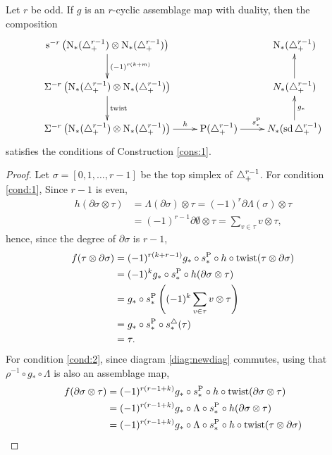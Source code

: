 \begin{proposition}\label{prop:assemblage}
	Let $r$ be odd. If $g$ is an $r$-cyclic assemblage map with duality, then the composition 
	\[\xymatrix{
	\sus{-r}\left(\chains(\asimplex^{r-1})\otimes \chains(\asimplex^{r-1})\right)\ar[d]^{(-1)^{r(k+m)}}&&
		 \chains(\asimplex^{r-1})
		\\
	\susp{-r}\left(\chains(\asimplex^{r-1})\otimes \chains(\asimplex^{r-1})\right)\ar[d]^-{\twist} &&
		 \cadenas(\asimplex^{r-1})\ar[u]
	\\
	\susp{-r}\left(\chains(\asimplex^{r-1})\otimes \chains(\asimplex^{r-1})\right)\ar[r]^-{h} &
	\Psd(\asimplex^{r-1}) \ar[r]^{s_*^{\Psd}} &
	\cadenas(\sd\asimplex^{r-1})\ar[u]_{g_*}
		}
	\]
satisfies the conditions of Construction \ref{cons:1}.
\end{proposition}
\begin{proof}
	Let $\sigma = [0,1,\ldots,r-1]$ be the top simplex of $\triangle_{+}^{r-1}$. For condition \eqref{cond:1},  Since $r-1$ is even,
		\begin{align*}
		h(\partial\sigma\otimes \tau) &= \Lambda(\partial \sigma)\otimes \tau = (-1)^{r}\partial \Lambda(\sigma)\otimes\tau 
		\\&= (-1)^{r-1}\partial\emptyset\otimes\tau = \sum_{v\in \tau} v\otimes\tau,
	\end{align*}
	hence, since the degree of $\partial \sigma$ is $r-1$,
	\begin{align*}
		f(\tau\otimes \partial\sigma)
		&=(-1)^{r(k+r-1)} g_*\circ s_*^{\operatorname{P}}\circ h \circ \mathrm{twist}(\tau\otimes \partial\sigma)\\
		&= (-1)^{k} g_*\circ s_*^{\operatorname{P}}\circ h (\partial\sigma\otimes \tau)\\
		&= g_*\circ s_*^{\operatorname{P}}\left((-1)^k\sum_{v\in \tau} v\otimes\tau\right) \\
		&= g_*\circ s_*^{\operatorname{P}}\circ s_*^{\triangle}(\tau) \\
		&= \tau.
	\end{align*}
	For condition \eqref{cond:2}, since diagram \eqref{diag:newdiag} commutes, using that $\rho^{-1}\circ g_*\circ \Lambda$ is also an assemblage map,
	\begin{align*}
		f(\partial\sigma\otimes \tau)
		&= (-1)^{r(r-1+k)}g_*\circ s_*^{\Psd}\circ h \circ \mathrm{twist}(\partial\sigma\otimes \tau) 
		\\
	&= (-1)^{r(r-1+k)} g_*\circ \Lambda\circ s_*^{\Psd}\circ h (\partial \sigma \otimes \tau)
	\\
	&= (-1)^{r(r-1+k)} g_*\circ \Lambda\circ s_*^{\Psd}\circ h \circ \mathrm{twist}(\tau\otimes \partial\sigma) 

\end{align*}
\end{proof}
